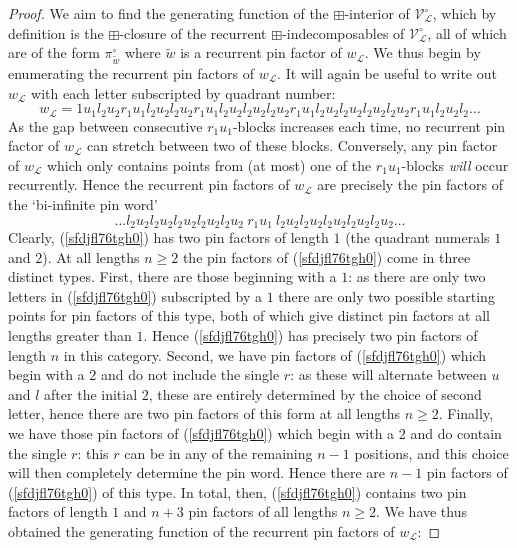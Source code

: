 \documentclass[11pt,a4paper]{article}
\theoremstyle{definition}
\begin{document}
\begin{proof}
We aim to find the generating function of the $\boxplus$-interior of $\mathcal{V}^{\circ}_{\mathcal{L}}$, which by definition is the $\boxplus$-closure of the recurrent $\boxplus$-indecomposables of $\mathcal{V}^{\circ}_{\mathcal{L}}$, all of which are of the form $\pi^{\circ}_{\widetilde{w}}$ where $\widetilde{w}$ is a recurrent pin factor of $w_{\mathcal{L}}$. We thus begin by enumerating the recurrent pin factors of $w_{\mathcal{L}}$. It will again be useful to write out $w_{\mathcal{L}}$ with each letter subscripted by quadrant number:
\[
w_{\mathcal{L}} = 1u_{1}l_{2}u_{2}r_{1}u_{1}l_{2}u_{2}l_{2}u_{2}r_{1}u_{1}l_{2}u_{2}l_{2}u_{2}l_{2}u_{2}r_{1}u_{1}l_{2}u_{2}l_{2}u_{2}l_{2}u_{2}l_{2}u_{2}r_{1}u_{1}l_{2}u_{2}l_{2} \dots
\]
As the gap between consecutive $r_{1}u_{1}$-blocks increases each time, no recurrent pin factor of $w_{\mathcal{L}}$ can stretch between two of these blocks. Conversely, any pin factor of $w_{\mathcal{L}}$ which only contains points from (at most) one of the $r_{1}u_{1}$-blocks \emph{will} occur recurrently. Hence the recurrent pin factors of $w_{\mathcal{L}}$ are precisely the pin factors of the `bi-infinite pin word'
\begin{equation} \label{sfdjfl76tgh0}
\dots l_{2}u_{2}l_{2}u_{2}l_{2}u_{2}l_{2}u_{2}l_{2}u_{2} \ r_{1}u_{1} \ l_{2}u_{2}l_{2}u_{2}l_{2}u_{2}l_{2}u_{2}l_{2}u_{2} \dots
\end{equation}
Clearly, (\ref{sfdjfl76tgh0}) has two pin factors of length $1$ (the quadrant numerals $1$ and $2$). At all lengths $n \geq 2$ the pin factors of (\ref{sfdjfl76tgh0}) come in three distinct types. First, there are those beginning with a $1$: as there are only two letters in (\ref{sfdjfl76tgh0}) subscripted by a $1$ there are only two possible starting points for pin factors of this type, both of which give distinct pin factors at all lengths greater than $1$. Hence (\ref{sfdjfl76tgh0}) has precisely two pin factors of length $n$ in this category. Second, we have pin factors of (\ref{sfdjfl76tgh0}) which begin with a $2$ and do not include the single $r$: as these will alternate between $u$ and $l$ after the initial $2$, these are entirely determined by the choice of second letter, hence there are two pin factors of this form at all lengths $n \geq 2$. Finally, we have those pin factors of (\ref{sfdjfl76tgh0}) which begin with a $2$ and do contain the single $r$: this $r$ can be in any of the remaining $n-1$ positions, and this choice will then completely determine the pin word. Hence there are $n-1$ pin factors of (\ref{sfdjfl76tgh0}) of this type. In total, then, (\ref{sfdjfl76tgh0}) contains two pin factors of length $1$ and $n+3$ pin factors of all lengths $n \geq 2$. We have thus obtained the generating function of the recurrent pin factors of $w_{\mathcal{L}}$:

\end{proof}
\end{document}
